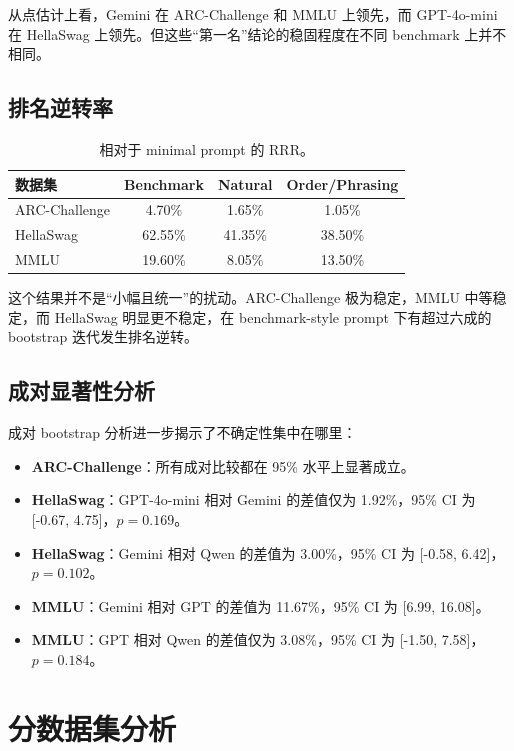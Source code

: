 \documentclass[11pt,a4paper]{ctexart}
\begin{document}
从点估计上看，Gemini 在 ARC-Challenge 和 MMLU 上领先，而 GPT-4o-mini 在 HellaSwag 上领先。但这些“第一名”结论的稳固程度在不同 benchmark 上并不相同。

\subsection{排名逆转率}

\begin{table}[H]
\centering
\caption{相对于 minimal prompt 的 RRR。}
\begin{tabular}{lccc}
\toprule
数据集 & Benchmark & Natural & Order/Phrasing \\
\midrule
ARC-Challenge & 4.70\% & 1.65\% & 1.05\% \\
HellaSwag & 62.55\% & 41.35\% & 38.50\% \\
MMLU & 19.60\% & 8.05\% & 13.50\% \\
\bottomrule
\end{tabular}
\end{table}

这个结果并不是“小幅且统一”的扰动。ARC-Challenge 极为稳定，MMLU 中等稳定，而 HellaSwag 明显更不稳定，在 benchmark-style prompt 下有超过六成的 bootstrap 迭代发生排名逆转。

\subsection{成对显著性分析}

成对 bootstrap 分析进一步揭示了不确定性集中在哪里：
\begin{itemize}[leftmargin=1.5em]
\item \textbf{ARC-Challenge}：所有成对比较都在 95\% 水平上显著成立。
\item \textbf{HellaSwag}：GPT-4o-mini 相对 Gemini 的差值仅为 1.92\%，95\% CI 为 [-0.67, 4.75]，$p=0.169$。
\item \textbf{HellaSwag}：Gemini 相对 Qwen 的差值为 3.00\%，95\% CI 为 [-0.58, 6.42]，$p=0.102$。
\item \textbf{MMLU}：Gemini 相对 GPT 的差值为 11.67\%，95\% CI 为 [6.99, 16.08]。
\item \textbf{MMLU}：GPT 相对 Qwen 的差值仅为 3.08\%，95\% CI 为 [-1.50, 7.58]，$p=0.184$。
\end{itemize}

\section{分数据集分析}
\end{document}
